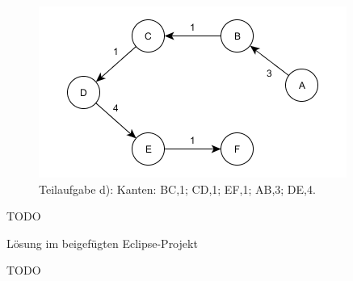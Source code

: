 \documentclass[12pt]{scrartcl}
\begin{document}
\begin{figure}[h!]
\begin{center}
\includegraphics[scale=0.5]{KruskalSpannbaum.png}
\caption{Teilaufgabe d): Kanten: BC,1; CD,1; EF,1; AB,3; DE,4.}
\end{center}
\end{figure}


\exercise{}
TODO

\exercise{}
Lösung im beigefügten Eclipse-Projekt

\exercise{}
TODO




\end{document}
